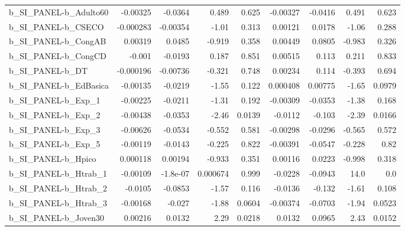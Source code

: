 \begin{tabular}{lrrrrrrrr}
b\_SI\_PANEL-b\_Adulto60      &    -0.00325 &      -0.0364 &     0.489 &    0.625 &   -0.00327 &     -0.0416 &        0.491 &         0.623 \\
b\_SI\_PANEL-b\_CSECO         &   -0.000283 &     -0.00354 &     -1.01 &    0.313 &    0.00121 &      0.0178 &        -1.06 &         0.288 \\
b\_SI\_PANEL-b\_CongAB        &     0.00319 &       0.0485 &    -0.919 &    0.358 &    0.00449 &      0.0805 &       -0.983 &         0.326 \\
b\_SI\_PANEL-b\_CongCD        &      -0.001 &      -0.0193 &     0.187 &    0.851 &    0.00515 &       0.113 &        0.211 &         0.833 \\
b\_SI\_PANEL-b\_DT            &   -0.000196 &     -0.00736 &    -0.321 &    0.748 &    0.00234 &       0.114 &       -0.393 &         0.694 \\
b\_SI\_PANEL-b\_EdBasica      &    -0.00135 &      -0.0219 &     -1.55 &    0.122 &   0.000408 &     0.00775 &        -1.65 &        0.0979 \\
b\_SI\_PANEL-b\_Exp\_1         &    -0.00225 &      -0.0211 &     -1.31 &    0.192 &   -0.00309 &     -0.0353 &        -1.38 &         0.168 \\
b\_SI\_PANEL-b\_Exp\_2         &    -0.00438 &      -0.0353 &     -2.46 &   0.0139 &    -0.0112 &      -0.103 &        -2.39 &        0.0166 \\
b\_SI\_PANEL-b\_Exp\_3         &    -0.00626 &      -0.0534 &    -0.552 &    0.581 &   -0.00298 &     -0.0296 &       -0.565 &         0.572 \\
b\_SI\_PANEL-b\_Exp\_5         &    -0.00119 &      -0.0143 &    -0.225 &    0.822 &   -0.00391 &     -0.0547 &       -0.228 &          0.82 \\
b\_SI\_PANEL-b\_Hpico         &    0.000118 &      0.00194 &    -0.933 &    0.351 &    0.00116 &      0.0223 &       -0.998 &         0.318 \\
b\_SI\_PANEL-b\_Htrab\_1       &    -0.00109 &     -1.8e-07 &  0.000674 &    0.999 &    -0.0228 &     -0.0943 &         14.0 &           0.0 \\
b\_SI\_PANEL-b\_Htrab\_2       &     -0.0105 &      -0.0853 &     -1.57 &    0.116 &    -0.0136 &      -0.132 &        -1.61 &         0.108 \\
b\_SI\_PANEL-b\_Htrab\_3       &    -0.00168 &       -0.027 &     -1.88 &   0.0604 &   -0.00374 &     -0.0703 &        -1.94 &        0.0523 \\
b\_SI\_PANEL-b\_Joven30       &     0.00216 &       0.0132 &      2.29 &   0.0218 &     0.0132 &      0.0965 &         2.43 &        0.0152 \\

\end{tabular}
